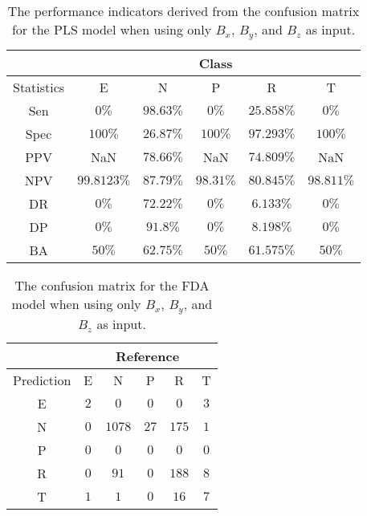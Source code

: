 \begin{table}[!ht]
	\centering
	\begin{tabular}{|c|c|c|c|c|c|}
		\hline
		 & \multicolumn{5}{c|}{Class} \\ \hline
		Statistics & E & N & P & R & T \\ \hline
		Sen & $0\%$ & $98.63\%$ & $0\%$ & $25.858\%$ & $0\%$ \\ \hline
		Spec & $100\%$ & $26.87\%$ & $100\%$ & $97.293\%$ & $100\%$ \\ \hline
		PPV & NaN & $78.66\%$ & NaN & $74.809\%$ & NaN \\ \hline
		NPV & $99.8123\%$ & $87.79\%$ & $98.31\%$ & $80.845\%$ & $98.811\%$ \\ \hline
		DR & $0\%$ & $72.22\%$ & $0\%$ & $6.133\%$ & $0\%$ \\ \hline
		DP & $0\%$ & $91.8\%$ & $0\%$ & $8.198\%$ & $0\%$ \\ \hline
		BA & $50\%$ & $62.75\%$ & $50\%$ & $61.575\%$ & $50\%$ \\ \hline
	\end{tabular}
	\caption{The performance indicators derived from the confusion matrix for the PLS model when using only $B_{x}$, $B_{y}$, and $B_{z}$ as input.}
	\label{tab:cs:reverse:coord:pls}
\end{table}

\begin{table}[!ht]
	\centering
	\begin{tabular}{|c|c|c|c|c|c|}
		\hline
		 & \multicolumn{5}{|c|}{Reference} \\ \hline
		 Prediction & E & N & P & R & T \\ \hline
		 E & $2$ & $0$ & $0$ & $0$ & $3$ \\ \hline
		 N & $0$ & $1078$ & $27$ & $175$ & $1$ \\ \hline
		 P & $0$ & $0$ & $0$ & $0$ & $0$ \\ \hline
		 R & $0$ & $91$ & $0$ & $188$ & $8$ \\ \hline
		 T & $1$ & $1$ & $0$ & $16$ & $7$ \\ \hline
	\end{tabular}
	\caption{The confusion matrix for the FDA model when using only $B_{x}$, $B_{y}$, and $B_{z}$ as input.}
	\label{tab:cm:coord:fda}
\end{table}

